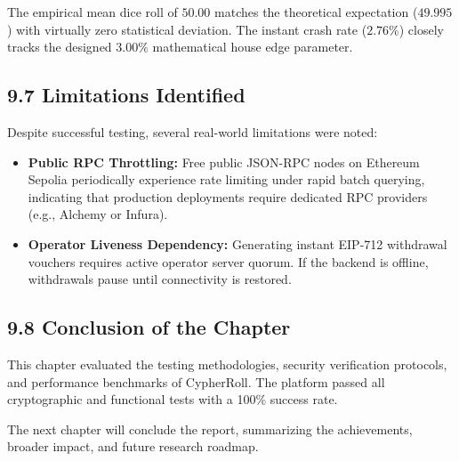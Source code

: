 The empirical mean dice roll of $50.00$ matches the theoretical expectation ($49.995$) with virtually zero statistical deviation. The instant crash rate ($2.76\%$) closely tracks the designed $3.00\%$ mathematical house edge parameter.

\subsection*{9.7 Limitations Identified}
Despite successful testing, several real-world limitations were noted:
\begin{itemize}[leftmargin=1.5em]
    \item \textbf{Public RPC Throttling:} Free public JSON-RPC nodes on Ethereum Sepolia periodically experience rate limiting under rapid batch querying, indicating that production deployments require dedicated RPC providers (e.g., Alchemy or Infura).
    \item \textbf{Operator Liveness Dependency:} Generating instant EIP-712 withdrawal vouchers requires active operator server quorum. If the backend is offline, withdrawals pause until connectivity is restored.
\end{itemize}

\subsection*{9.8 Conclusion of the Chapter}
This chapter evaluated the testing methodologies, security verification protocols, and performance benchmarks of CypherRoll. The platform passed all cryptographic and functional tests with a 100\% success rate.

The next chapter will conclude the report, summarizing the achievements, broader impact, and future research roadmap.
\label{chap:testing_end}
